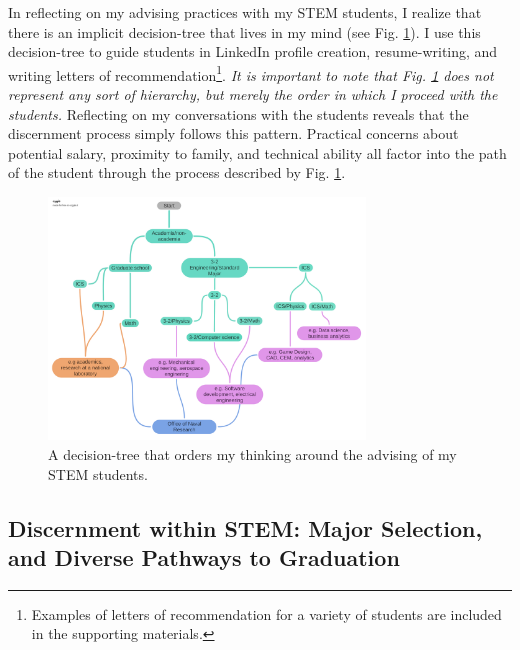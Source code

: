 \documentclass[../../../main.tex]{subfiles}
\begin{document}
In reflecting on my advising practices with my STEM students, I realize that there is an implicit decision-tree that lives in my mind (see Fig. \ref{fig:tree}).  I use this decision-tree to guide students in LinkedIn profile creation, resume-writing, and writing letters of recommendation\footnote{Examples of letters of recommendation for a variety of students are included in the supporting materials.}.  \textit{It is important to note that Fig. \ref{fig:tree} does not represent any sort of hierarchy, but merely the order in which I proceed with the students.}  Reflecting on my conversations with the students reveals that the discernment process simply follows this pattern.  Practical concerns about potential salary, proximity to family, and technical ability all factor into the path of the student through the process described by Fig. \ref{fig:tree}.

\begin{figure}
\centering
\includegraphics[width=0.75\textwidth]{figures/Advising_tree.pdf}
\caption{\label{fig:tree} A decision-tree that orders my thinking around the advising of my STEM students.}
\end{figure}

\subsection{Discernment within STEM: Major Selection, and Diverse Pathways to Graduation}
\end{document}
